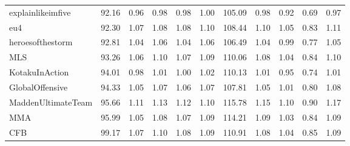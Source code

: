 \begin{tabular}{lrrrrrrrrrr}
explainlikeimfive   &          92.16 &                0.96 &                0.98 &                0.98 &                1.00 &                105.09 &                       0.98 &                       0.92 &                       0.69 &                       0.97 \\
eu4                 &          92.30 &                1.07 &                1.08 &                1.08 &                1.10 &                108.44 &                       1.10 &                       1.05 &                       0.83 &                       1.11 \\
heroesofthestorm    &          92.81 &                1.04 &                1.06 &                1.04 &                1.06 &                106.49 &                       1.04 &                       0.99 &                       0.77 &                       1.05 \\
MLS                 &          93.26 &                1.06 &                1.10 &                1.07 &                1.09 &                110.06 &                       1.08 &                       1.04 &                       0.84 &                       1.10 \\
KotakuInAction      &          94.01 &                0.98 &                1.01 &                1.00 &                1.02 &                110.13 &                       1.01 &                       0.95 &                       0.74 &                       1.01 \\
GlobalOffensive     &          94.33 &                1.05 &                1.07 &                1.06 &                1.07 &                107.81 &                       1.05 &                       1.01 &                       0.80 &                       1.08 \\
MaddenUltimateTeam  &          95.66 &                1.11 &                1.13 &                1.12 &                1.10 &                115.78 &                       1.15 &                       1.10 &                       0.90 &                       1.17 \\
MMA                 &          95.99 &                1.05 &                1.08 &                1.07 &                1.09 &                114.21 &                       1.09 &                       1.03 &                       0.84 &                       1.09 \\
CFB                 &          99.17 &                1.07 &                1.10 &                1.08 &                1.09 &                110.91 &                       1.08 &                       1.04 &                       0.85 &                       1.09 \\

\end{tabular}
